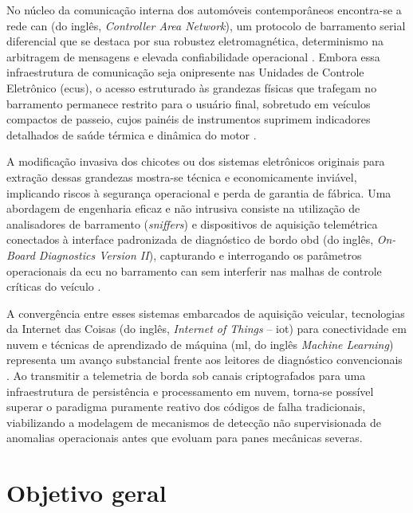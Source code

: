 \documentclass[
	12pt,				%
	openright,			%
	twoside,			%
	a4paper,			%
	english,			%
	brazil				%
	]{abntex2}
\begin{document}
No núcleo da comunicação interna dos automóveis contemporâneos encontra-se a rede
\acrshort{can} (do inglês, \textit{Controller Area Network}), um protocolo de barramento
serial diferencial que se destaca por sua robustez eletromagnética, determinismo na
arbitragem de mensagens e elevada confiabilidade operacional \cite{bosch2012}. Embora
essa infraestrutura de comunicação seja onipresente nas Unidades de Controle Eletrônico
(\acrshort{ecu}s), o acesso estruturado às grandezas físicas que trafegam no barramento
permanece restrito para o usuário final, sobretudo em veículos compactos de passeio,
cujos painéis de instrumentos suprimem indicadores detalhados de saúde térmica e
dinâmica do motor \cite{guimaraes2007}.

A modificação invasiva dos chicotes ou dos sistemas eletrônicos originais para extração
dessas grandezas mostra-se técnica e economicamente inviável, implicando riscos à
segurança operacional e perda de garantia de fábrica. Uma abordagem de engenharia eficaz
e não intrusiva consiste na utilização de analisadores de barramento (\textit{sniffers})
e dispositivos de aquisição telemétrica conectados à interface padronizada de
diagnóstico de bordo \acrshort{obd} (do inglês,
\textit{On-Board Diagnostics Version II}), capturando e interrogando os parâmetros
operacionais da \acrshort{ecu} no barramento \acrshort{can} sem interferir nas malhas de
controle críticas do veículo \cite{iso15765,csselectronics2024}.

A convergência entre esses sistemas embarcados de aquisição veicular, tecnologias da
Internet das Coisas (do inglês, \textit{Internet of Things} -- \acrshort{iot}) para
conectividade em nuvem e técnicas de aprendizado de máquina (\acrshort{ml}, do inglês
\textit{Machine Learning}) representa um avanço substancial frente aos leitores de
diagnóstico convencionais \cite{iqbal2019,singh2021}. Ao transmitir a
telemetria de borda sob canais criptografados para uma infraestrutura de persistência e
processamento em nuvem, torna-se possível superar o paradigma puramente reativo dos
códigos de falha tradicionais, viabilizando a modelagem de mecanismos de detecção não
supervisionada de anomalias operacionais antes que evoluam para panes mecânicas severas.

\section{Objetivo geral}
\end{document}
